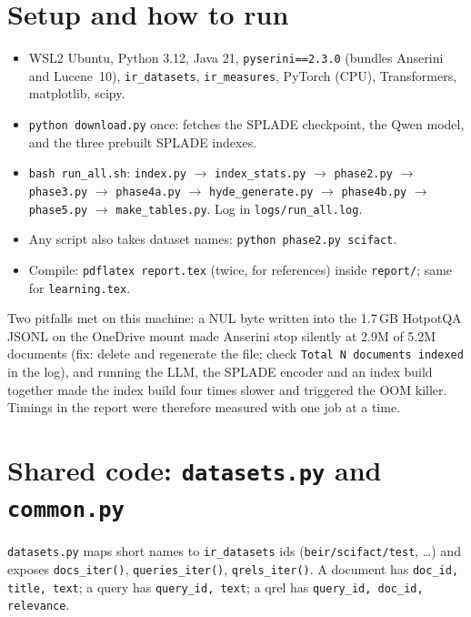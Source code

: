 \documentclass[11pt,a4paper]{article}
\begin{document}
\section{Setup and how to run}
\begin{itemize}[nosep]
  \item WSL2 Ubuntu, Python 3.12, Java 21, \texttt{pyserini==2.3.0} (bundles Anserini and Lucene~10), \texttt{ir\_datasets}, \texttt{ir\_measures}, PyTorch (CPU), Transformers, matplotlib, scipy.
  \item \texttt{python download.py} once: fetches the SPLADE checkpoint, the Qwen model, and the three prebuilt SPLADE indexes.
  \item \texttt{bash run\_all.sh}: \texttt{index.py} $\to$ \texttt{index\_stats.py} $\to$ \texttt{phase2.py} $\to$ \texttt{phase3.py} $\to$ \texttt{phase4a.py} $\to$ \texttt{hyde\_generate.py} $\to$ \texttt{phase4b.py} $\to$ \texttt{phase5.py} $\to$ \texttt{make\_tables.py}. Log in \texttt{logs/run\_all.log}.
  \item Any script also takes dataset names: \texttt{python phase2.py scifact}.
  \item Compile: \texttt{pdflatex report.tex} (twice, for references) inside \texttt{report/}; same for \texttt{learning.tex}.
\end{itemize}
Two pitfalls met on this machine: a NUL byte written into the 1.7\,GB HotpotQA JSONL on the OneDrive mount made Anserini stop
silently at 2.9M of 5.2M documents (fix: delete and regenerate the file; check \texttt{Total N documents indexed} in the log),
and running the LLM, the SPLADE encoder and an index build together made the index build four times slower and triggered the
OOM killer. Timings in the report were therefore measured with one job at a time.

\section{Shared code: \texttt{datasets.py} and \texttt{common.py}}
\texttt{datasets.py} maps short names to \texttt{ir\_datasets} ids (\texttt{beir/scifact/test}, \ldots) and exposes
\texttt{docs\_iter()}, \texttt{queries\_iter()}, \texttt{qrels\_iter()}. A document has \texttt{doc\_id, title, text};
a query has \texttt{query\_id, text}; a qrel has \texttt{query\_id, doc\_id, relevance}.
\end{document}
